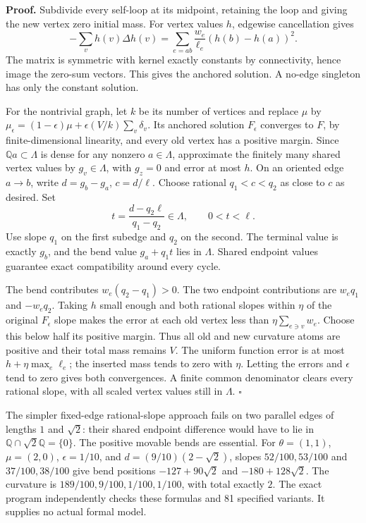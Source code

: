 \documentclass[
  11pt,
]{article}
\begin{document}
\textbf{Proof.} Subdivide every self-loop at its midpoint, retaining the
loop and giving the new vertex zero initial mass. For vertex values
\(h\), edgewise cancellation gives \[
 -\sum_vh(v)\Delta h(v)=\sum_{e=ab}\frac{w_e}{\ell_e}(h(b)-h(a))^2.
\] The matrix is symmetric with kernel exactly constants by
connectivity, hence image the zero-sum vectors. This gives the anchored
solution. A no-edge singleton has only the constant solution.

For the nontrivial graph, let \(k\) be its number of vertices and
replace \(\mu\) by
\(\mu_\epsilon=(1-\epsilon)\mu+\epsilon(V/k)\sum_v\delta_v\). Its
anchored solution \(F_\epsilon\) converges to \(F\), by
finite-dimensional linearity, and every old vertex has a positive
margin. Since \(\mathbb Q a\subset\Lambda\) is dense for any nonzero
\(a\in\Lambda\), approximate the finitely many shared vertex values by
\(g_v\in\Lambda\), with \(g_z=0\) and error at most \(h\). On an
oriented edge \(a\to b\), write \(d=g_b-g_a\), \(c=d/\ell\). Choose
rational \(q_1<c<q_2\) as close to \(c\) as desired. Set \[
 t=\frac{d-q_2\ell}{q_1-q_2}\in\Lambda,\qquad 0<t<\ell.
\] Use slope \(q_1\) on the first subedge and \(q_2\) on the second. The
terminal value is exactly \(g_b\), and the bend value \(g_a+q_1t\) lies
in \(\Lambda\). Shared endpoint values guarantee exact compatibility
around every cycle.

The bend contributes \(w_e(q_2-q_1)>0\). The two endpoint contributions
are \(w_eq_1\) and \(-w_eq_2\). Taking \(h\) small enough and both
rational slopes within \(\eta\) of the original \(F_\epsilon\) slope
makes the error at each old vertex less than \(\eta\sum_{e\ni v}w_e\).
Choose this below half its positive margin. Thus all old and new
curvature atoms are positive and their total mass remains \(V\). The
uniform function error is at most \(h+\eta\max_e\ell_e\); the inserted
mass tends to zero with \(\eta\). Letting the errors and \(\epsilon\)
tend to zero gives both convergences. A finite common denominator clears
every rational slope, with all scaled vertex values still in
\(\Lambda\). \(\square\)

The simpler fixed-edge rational-slope approach fails on two parallel
edges of lengths \(1\) and \(\sqrt2\): their shared endpoint difference
would have to lie in \(\mathbb Q\cap\sqrt2\mathbb Q=\{0\}\). The
positive movable bends are essential. For \(\theta=(1,1)\),
\(\mu=(2,0)\), \(\epsilon=1/10\), and \(d=(9/10)(2-\sqrt2)\), slopes
\(52/100,53/100\) and \(37/100,38/100\) give bend positions
\(-127+90\sqrt2\) and \(-180+128\sqrt2\). The curvature is
\(189/100,9/100,1/100,1/100\), with total exactly \(2\). The exact
program independently checks these formulas and 81 specified variants.
It supplies no actual formal model.
\end{document}

